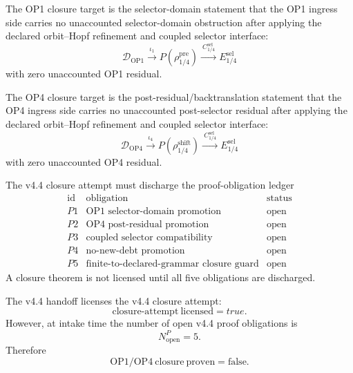 \begin{definition}
The OP1 closure target is the selector-domain statement that the OP1 ingress
side carries no unaccounted selector-domain obstruction after applying the
declared orbit--Hopf refinement and coupled selector interface:
\[
    \mathcal D_{\mathrm{OP1}}
    \xrightarrow{\ \iota_1\ }
    P(\rho_{1/4}^{\mathrm{pre}})
    \xrightarrow{\ C_{1/4}^{\mathrm{sel}}\ }
    E_{1/4}^{\mathrm{sel}}
\]
with zero unaccounted OP1 residual.
\end{definition}

\begin{definition}
The OP4 closure target is the post-residual/backtranslation statement that the
OP4 ingress side carries no unaccounted post-selector residual after applying
the declared orbit--Hopf refinement and coupled selector interface:
\[
    \mathcal D_{\mathrm{OP4}}
    \xrightarrow{\ \iota_4\ }
    P(\rho_{1/4}^{\mathrm{shift}})
    \xrightarrow{\ C_{1/4}^{\mathrm{sel}}\ }
    E_{1/4}^{\mathrm{sel}}
\]
with zero unaccounted OP4 residual.
\end{definition}

\begin{definition}
The v4.4 closure attempt must discharge the proof-obligation ledger
\[
\begin{array}{c|l|c}
\text{id} & \text{obligation} & \text{status}\\
\hline
P1 & \text{OP1 selector-domain promotion} & \mathrm{open}\\
P2 & \text{OP4 post-residual promotion} & \mathrm{open}\\
P3 & \text{coupled selector compatibility} & \mathrm{open}\\
P4 & \text{no-new-debt promotion} & \mathrm{open}\\
P5 & \text{finite-to-declared-grammar closure guard} & \mathrm{open}
\end{array}
\]
A closure theorem is not licensed until all five obligations are discharged.
\end{definition}

\begin{proposition}
The v4.4 handoff licenses the v4.4 closure attempt:
\[
    \mathrm{closure\text{-}attempt\ licensed}=true.
\]
However, at intake time the number of open v4.4 proof obligations is
\[
    N_{\mathrm{open}}^{P}=5.
\]
Therefore
\[
    \mathrm{OP1/OP4\ closure\ proven}=\mathrm{false}.
\]
\end{proposition}

